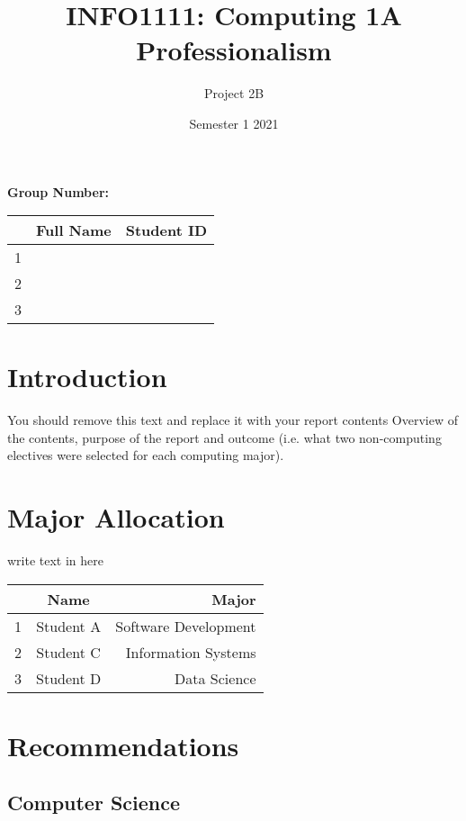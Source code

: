 \documentclass{article}
\title{INFO1111: Computing 1A Professionalism}
\date{Semester 1 2021}
\author{Project 2B}
\begin{document}
\maketitle

\begin{center}
    \textbf{Group Number:}
\end{center}

\begin{center}
\begin{tabular}{|l|c|r|}
\hline
  & Full Name & Student ID \\ \hline
1 &           &            \\ \hline
2 &           &            \\ \hline
3 &           &            \\ \hline
\end{tabular}
\end{center}
\thispagestyle{empty}
\newpage

\setcounter{page}{1}
\section{Introduction}
You should remove this text and replace it with your report contents
Overview of the contents, purpose of the report and outcome (i.e. what two non-computing electives were selected for each computing major).


\section{Major Allocation}
write text in here
\begin{center}
\begin{tabular}{|l|c|r|}
\hline
  & Name      & Major                \\ \hline
1 & Student A & Software Development \\ \hline
2 & Student C & Information Systems  \\ \hline
3 & Student D & Data Science         \\ \hline
\end{tabular}
\end{center}

\section{Recommendations}

\subsection{Computer Science}
\end{document}
